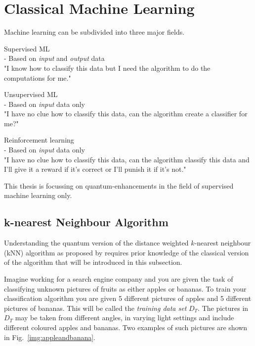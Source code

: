 
\section{Classical Machine Learning}
\label{subsec:classicalmachinelearning}

Machine learning can be subdivided into three major fields.

\begin{redbox}
Supervised ML\\
- Based on \emph{input} and \emph{output} data\\
"I know how to classify this data but I need the algorithm to do the computations for me."
\end{redbox}
\begin{greenbox}
Unsupervised ML\\
- Based on \emph{input} data only\\
"I have no clue how to classify this data, can the algorithm create a classifier for me?"
\end{greenbox}
\begin{bluebox}
Reinforcement learning\\
- Based on \emph{input} data only\\
"I have no clue how to classify this data, can the algorithm classify this data and I'll give it a reward if it's correct or I'll punish it if it's not."
\end{bluebox}

This thesis is focussing on quantum-enhancements in the field of supervised machine learning only.

\subsection{k-nearest Neighbour Algorithm}
\label{subsubsec:knearestneighbour}

Understanding the quantum version of the distance weighted $k$-nearest neighbour (kNN) algorithm as proposed by  requires prior knowledge of the classical version of the algorithm that will be introduced in this subsection.

Imagine working for a search engine company and you are given the task of classifying unknown pictures of fruits as either apples or bananas. To train your classification algorithm you are given 5 different pictures of apples and 5 different pictures of bananas. This will be called the \emph{training data set} ${D}_{T}$. The pictures in ${D}_{T}$ may be taken from different angles, in varying light settings and include different coloured apples and bananas. Two examples of such pictures are shown in Fig.~\ref{img:appleandbanana}. 

